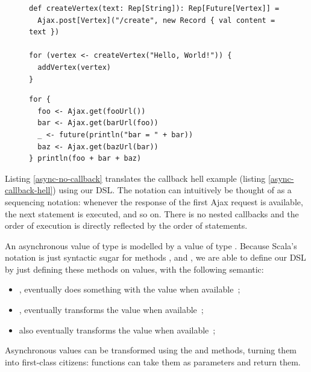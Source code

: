 \documentclass[american,english,runningheads]{llncs}
\begin{document}
\begin{figure}
\centering
\begin{lstlisting}[caption=Asynchronous values are first class citizen,label=async-first-class]
def createVertex(text: Rep[String]): Rep[Future[Vertex]] =
  Ajax.post[Vertex]("/create", new Record { val content = text })

for (vertex <- createVertex("Hello, World!")) {
  addVertex(vertex)
}
\end{lstlisting}
\end{figure}

\begin{figure}
\centering
\begin{lstlisting}[caption=No callback hell,label=async-no-callback]
for {
  foo <- Ajax.get(fooUrl())
  bar <- Ajax.get(barUrl(foo))
  _ <- future(println("bar = " + bar))
  baz <- Ajax.get(bazUrl(bar))
} println(foo + bar + baz)
\end{lstlisting}
\end{figure}

Listing \ref{async-no-callback} translates the callback hell example (listing \ref{async-callback-hell}) using
our DSL. The  notation can intuitively be thought of as a sequencing notation: whenever the response of the
first Ajax request is available, the next statement is executed, and so on. There is no nested callbacks and the
order of execution is directly reflected by the order of statements.

An asynchronous value of type  is modelled by a value of type . Because Scala’s
 notation is just syntactic sugar for methods ,  and , we are
able to define our DSL by just defining these methods on  values, with the following semantic:
\begin{itemize}
\item {}, eventually does something with the value when available~;
\item {}, eventually transforms the value when available~;
\item {} also eventually transforms the value when available~;
\end{itemize}

Asynchronous values can be transformed using the  and  methods, turning them into first-class
citizens: functions can take them as parameters and return them.
\end{document}
